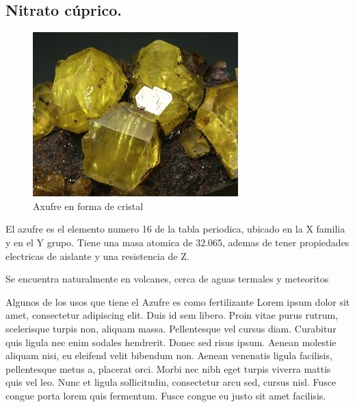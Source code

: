 \documentclass[letter]{article}
\begin{document}
    \subsection{Nitrato cúprico.}
        \begin{figure}
            \includegraphics[width=1\linewidth]{azufre} 
            \caption{Axufre en forma de cristal}
            \label{fig:subim1}
        \end{figure}
        El azufre es el elemento numero 16 de la tabla periodica, ubicado en la X familia y en el Y grupo. Tiene una masa atomica de 32.065, ademas de tener propiedades electricas de aislante y una resistencia de Z.\par
        Se encuentra naturalmente en volcanes, cerca de aguas termales y meteoritos \par
        Algunos de los usos que tiene el Azufre es como fertilizante \cite{acuna1991fertilizacion}
        Lorem ipsum dolor sit amet, consectetur adipiscing elit. Duis id sem libero. Proin vitae purus rutrum, scelerisque turpis non, aliquam massa. Pellentesque vel cursus diam. Curabitur quis ligula nec enim sodales hendrerit. Donec sed risus ipsum. Aenean molestie aliquam nisi, eu eleifend velit bibendum non. Aenean venenatis ligula facilisis, pellentesque metus a, placerat orci. Morbi nec nibh eget turpis viverra mattis quis vel leo. Nunc et ligula sollicitudin, consectetur arcu sed, cursus nisl. Fusce congue porta lorem quis fermentum. Fusce congue eu justo sit amet facilisis.\par
\end{document}

